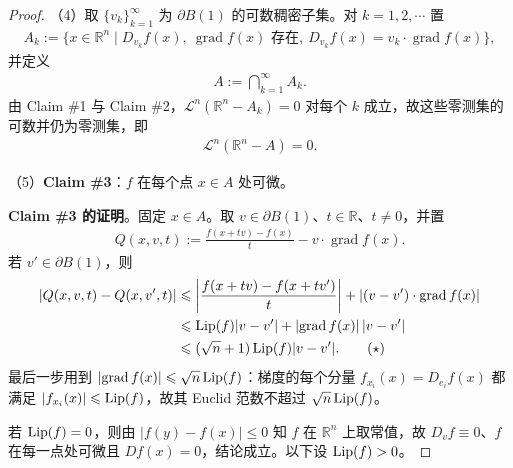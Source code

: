 \documentclass[../../main.tex]{subfiles}%
\begin{document}
\begin{proof}
（4）取 $\{v_k\}_{k=1}^{\infty}$ 为 $\partial B(1)$ 的可数稠密子集。对 $k=1,2,\cdots$ 置
\begin{align*}
A_k:=\{x\in\mathbb{R}^n\mid D_{v_k}f(x),\ \operatorname{grad}f(x)\text{ 存在},\ D_{v_k}f(x)=v_k\cdot\operatorname{grad}f(x)\},
\end{align*}
并定义
\begin{align*}
A:=\bigcap_{k=1}^{\infty}A_k.
\end{align*}
由 Claim \#1 与 Claim \#2，$\mathcal{L}^n(\mathbb{R}^n-A_k)=0$ 对每个 $k$ 成立，故这些零测集的可数并仍为零测集，即
\begin{align*}
\mathcal{L}^n(\mathbb{R}^n-A)=0.
\end{align*}

（5）\textbf{Claim \#3}：$f$ 在每个点 $x\in A$ 处可微。

\textbf{Claim \#3 的证明}。固定 $x\in A$。取 $v\in\partial B(1)$、$t\in\mathbb{R}$、$t\neq0$，并置
\begin{align*}
Q(x,v,t):=\frac{f(x+tv)-f(x)}{t}-v\cdot\operatorname{grad}f(x).
\end{align*}
若 $v'\in\partial B(1)$，则
\begin{align*}
\lvert Q(x,v,t)-Q(x,v',t)\rvert
&\leqslant\biggl\lvert\frac{f(x+tv)-f(x+tv')}{t}\biggr\rvert+\lvert(v-v')\cdot\operatorname{grad}f(x)\rvert\\
&\leqslant\operatorname{Lip}(f)\lvert v-v'\rvert+\lvert\operatorname{grad}f(x)\rvert\,\lvert v-v'\rvert\\
&\leqslant(\sqrt{n}+1)\operatorname{Lip}(f)\lvert v-v'\rvert.\qquad(\star)
\end{align*}
最后一步用到 $\lvert\operatorname{grad}f(x)\rvert\leqslant\sqrt{n}\operatorname{Lip}(f)$：梯度的每个分量 $f_{x_i}(x)=D_{e_i}f(x)$ 都满足 $\lvert f_{x_i}(x)\rvert\leqslant\operatorname{Lip}(f)$，故其 Euclid 范数不超过 $\sqrt{n}\operatorname{Lip}(f)$。

若 $\operatorname{Lip}(f)=0$，则由 $\lvert f(y)-f(x)\rvert\leqslant0$ 知 $f$ 在 $\mathbb{R}^n$ 上取常值，故 $D_vf\equiv0$、$f$ 在每一点处可微且 $Df(x)=0$，结论成立。以下设 $\operatorname{Lip}(f)>0$。


\end{proof}
\end{document}
